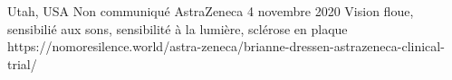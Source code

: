          {Utah, USA}
          {Non communiqué}
          {AstraZeneca}
          {4 novembre 2020}
          {
            Vision floue,
            sensibilié aux sons,
            sensibilité à la lumière,
            sclérose en plaque
          }
          {https://nomoresilence.world/astra-zeneca/brianne-dressen-astrazeneca-clinical-trial/}

